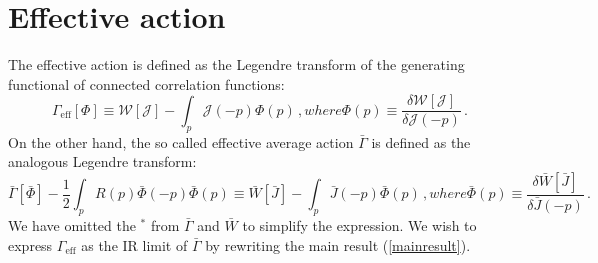 \documentclass[aps,prd,preprint,groupedaddress,preprintnumbers,longbibliography]{revtex4-1}
\newcommand{\WW}{\mathcal{W}}
\newcommand{\JJ}{\mathcal{J}}
\begin{document}
\section{Effective action\label{appendix-Gamma}}


The effective action is defined as the Legendre transform of the
generating functional of connected correlation functions:
\begin{subequations}
\label{Gamma-def}
\begin{equation}
\Gamma_{\mathrm{eff}} [\Phi] \equiv \WW [\JJ] - \int_p \JJ (-p) \Phi (p)\,,
\end{equation}
where
\begin{equation}
\Phi (p) \equiv \frac{\delta \WW [\JJ]}{\delta \JJ (-p)}\,.
\end{equation}
\end{subequations}
On the other hand, the so called effective average action
$\bar{\Gamma}$ is defined as the analogous Legendre transform:
\begin{subequations}
\begin{equation}
\bar{\Gamma} [\bar{\Phi}] - \frac{1}{2} \int_p R (p) \bar{\Phi} (-p)
\bar{\Phi} (p) \equiv \bar{W} [\bar{J}] - \int_p \bar{J} (-p)
\bar{\Phi} (p)\,,
\end{equation}
where
\begin{equation}
\bar{\Phi} (p) \equiv \frac{\delta \bar{W}[\bar{J}]}{\delta \bar{J}
  (-p)}\,.
\end{equation}
\end{subequations}
We have omitted the ${}^*$ from $\bar{\Gamma}$ and $\bar{W}$ to
simplify the expression.  We wish to express $\Gamma_{\mathrm{eff}}$
as the IR limit of $\bar{\Gamma}$ by rewriting the main result
(\ref{mainresult}).
\end{document}
